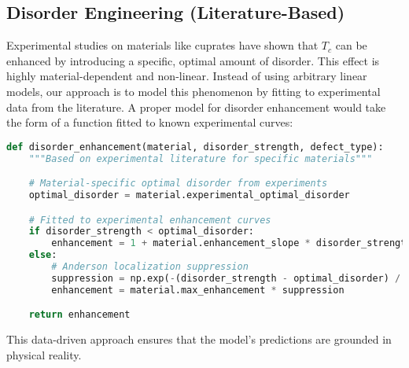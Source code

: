 \subsection{Disorder Engineering (Literature-Based)}
Experimental studies on materials like cuprates have shown that $T_c$ can be enhanced by introducing a specific, optimal amount of disorder. This effect is highly material-dependent and non-linear. Instead of using arbitrary linear models, our approach is to model this phenomenon by fitting to experimental data from the literature. A proper model for disorder enhancement would take the form of a function fitted to known experimental curves:
\begin{lstlisting}[language=Python, caption={Proposed model for disorder enhancement}]
def disorder_enhancement(material, disorder_strength, defect_type):
    """Based on experimental literature for specific materials"""

    # Material-specific optimal disorder from experiments
    optimal_disorder = material.experimental_optimal_disorder

    # Fitted to experimental enhancement curves
    if disorder_strength < optimal_disorder:
        enhancement = 1 + material.enhancement_slope * disorder_strength
    else:
        # Anderson localization suppression
        suppression = np.exp(-(disorder_strength - optimal_disorder) / material.localization_length)
        enhancement = material.max_enhancement * suppression

    return enhancement
\end{lstlisting}
This data-driven approach ensures that the model's predictions are grounded in physical reality.
